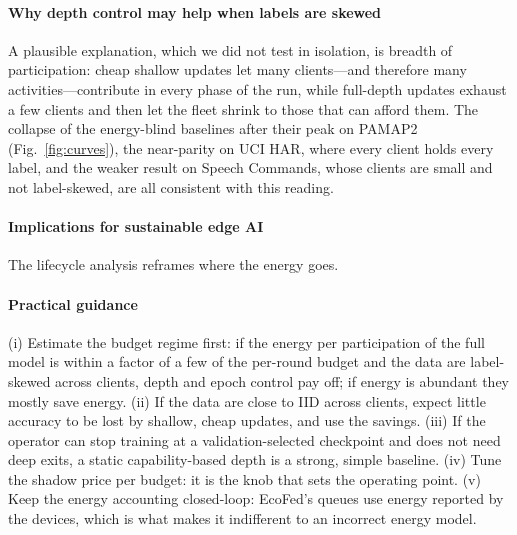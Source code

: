 \paragraph{Why depth control may help when labels are skewed}
A plausible explanation, which we did not test in isolation, is breadth of participation: cheap shallow updates let many clients---and therefore many activities---contribute in every phase of the run, while full-depth updates exhaust a few clients and then let the fleet shrink to those that can afford them. The collapse of the energy-blind baselines after their peak on PAMAP2 (Fig.~\ref{fig:curves}), the near-parity on UCI HAR, where every client holds every label, and the weaker result on Speech Commands, whose clients are small and not label-skewed, are all consistent with this reading.

\paragraph{Implications for sustainable edge AI}
The lifecycle analysis reframes where the energy goes. 

\paragraph{Practical guidance}
(i) Estimate the budget regime first: if the energy per participation of the full model is within a factor of a few of the per-round budget and the data are label-skewed across clients, depth and epoch control pay off; if energy is abundant they mostly save energy. (ii) If the data are close to IID across clients, expect little accuracy to be lost by shallow, cheap updates, and use the savings. (iii) If the operator can stop training at a validation-selected checkpoint and does not need deep exits, a static capability-based depth is a strong, simple baseline. (iv) Tune the shadow price per budget: it is the knob that sets the operating point. (v) Keep the energy accounting closed-loop: EcoFed's queues use energy reported by the devices, which is what makes it indifferent to an incorrect energy model.

